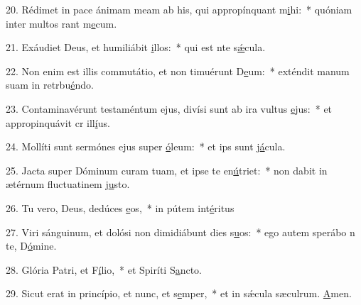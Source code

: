 20. Rédimet in pace ánimam meam ab his, qui appropínquant m\uline{i}hi:~* quóniam inter multos rant m\uline{e}cum.\par 
21. Exáudiet Deus, et humiliábit \uline{i}llos:~* qui est nte s\uline{ǽ}cula.\par 
22. Non enim est illis commutátio, et non timuérunt D\uline{e}um:~* exténdit manum suam in retrbu\uline{é}ndo.\par 
23. Contaminavérunt testaméntum ejus, divísi sunt ab ira vultus \uline{e}jus:~* et appropinquávit cr ill\uline{í}us.\par 
24. Mollíti sunt sermónes ejus super \uline{ó}leum:~* et ips sunt j\uline{á}cula.\par 
25. Jacta super Dóminum curam tuam, et ipse te en\uline{ú}triet:~* non dabit in ætérnum fluctuatinem j\uline{u}sto.\par 
26. Tu vero, Deus, dedúces \uline{e}os,~* in pútem int\uline{é}ritus\par 
27. Viri sánguinum, et dolósi non dimidiábunt dies s\uline{u}os:~* ego autem sperábo n te, D\uline{ó}mine.\par 
28. Glória Patri, et F\uline{í}lio,~* et Spiríti S\uline{a}ncto.\par 
29. Sicut erat in princípio, et nunc, et s\uline{e}mper,~* et in sǽcula sæculrum. \uline{A}men.\par 

